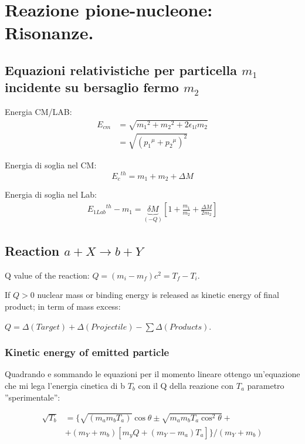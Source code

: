 \documentclass[main.tex]{subfiles}
\begin{document}
\chapter{Reazione pione-nucleone: Risonanze.}

\section{Equazioni relativistiche per particella $m_1$ incidente su bersaglio fermo $m_2$}

Energia CM/LAB:
\begin{align*}
E_{cm}&=\sqrt{{m_1}^2+{m_2}^2+2\epsilon_{1l}m_2}\\
&=\sqrt{({p_1}^{\mu}+{p_2}^{\mu})^2}
\end{align*}

Energia di soglia nel CM: 
\begin{equation*}
{E_c}^{th}=m_1+m_2+\Delta M
\end{equation*}

Energia di soglia nel Lab: 
\begin{align*}
{E_{1Lab}}^{th}-m_1=\underbrace{\delta M}_{(-Q)}[1+\frac{m_1}{m_2}+\frac{\Delta M}{2m_2}]
\end{align*}


\section{Reaction $a+X\rightarrow b+Y$}
Q value of the reaction: $Q=(m_i-m_f)c^2=T_f-T_i$.

If $Q>0$ nuclear mass or binding energy is released as kinetic energy of final product; in term of mass excess:

$Q=\Delta(Target)+\Delta(Projectile)-\sum\Delta(Products)$.

\subsection{Kinetic energy of emitted particle}

Quadrando e sommando le equazioni per il momento lineare
 ottengo un'equazione che mi lega l'energia cinetica di b $T_b$ con il Q della reazione con $T_a$ parametro ''sperimentale'':

\begin{align*}
\sqrt{T_b}&=\{\sqrt{(m_am_bT_a)}\cos{\theta}\pm\sqrt{m_am_bT_a\cos^2{\theta}}+\\
&+(m_Y+m_b)[m_yQ+(m_Y-m_a)T_a]\}/(m_Y+m_b)
\end{align*}
\end{document}
